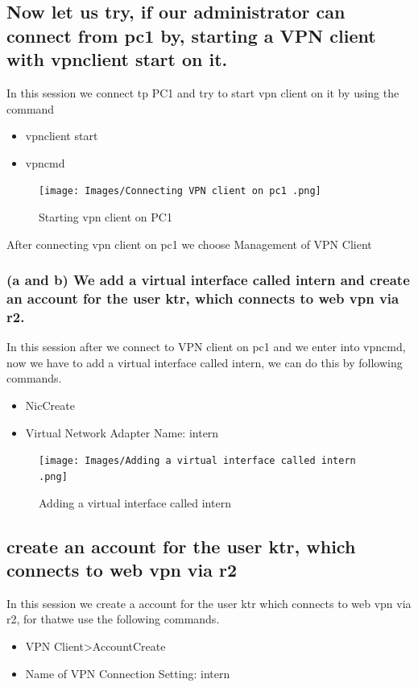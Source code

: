 \subsection{Now let us try, if our administrator can connect from pc1 by, starting a VPN client with vpnclient start on it.}
In this session we connect tp PC1 and try to start vpn client on it by using the command 
\begin{itemize}
\item vpnclient start
\item vpncmd
\end{itemize}
\begin{figure}[H]
\centering
  \texttt{[image: Images/Connecting VPN client on pc1 .png]}
  \caption{Starting vpn client on PC1 }
  \label{fig }
\end{figure}
After connecting vpn client on pc1 we choose Management of VPN Client
\subsubsection{(a and b) We add a virtual interface called intern and create an account for the user ktr, which connects to web vpn via r2.
}
In this session after we connect to VPN client on pc1 and we enter into vpncmd, now we have to add a virtual interface called intern, we can do this by following commands.
\begin{itemize}
\item NicCreate
\item Virtual Network Adapter Name: intern
\end{itemize}
\begin{figure}[H]
\centering
  \texttt{[image: Images/Adding a virtual interface called intern .png]}
  \caption{Adding a virtual interface called intern }
  \label{fig }
\end{figure}

\subsection{create an account for the user ktr, which connects to web vpn via r2}
In this session we create a account for the user ktr which connects to web vpn via r2, for thatwe use the following commands.
\begin{itemize}
\item VPN Client>AccountCreate
\item Name of VPN Connection Setting: intern
\end{itemize}

